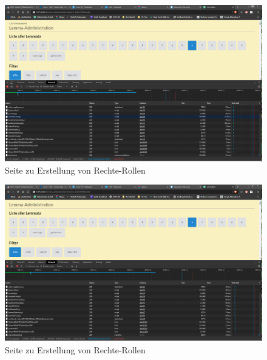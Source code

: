 \begin{figure}
	\centering
	\includegraphics[width=1\linewidth]{images/setup/query/time_prod_ela.png}
	\caption{Seite zu Erstellung von Rechte-Rollen}
	\label{img:timeProdEla}
\end{figure}

\begin{figure}
	\centering
	\includegraphics[width=1\linewidth]{images/setup/query/time_prod_db.png}
	\caption{Seite zu Erstellung von Rechte-Rollen}
	\label{img:timeProdDb}
\end{figure}



